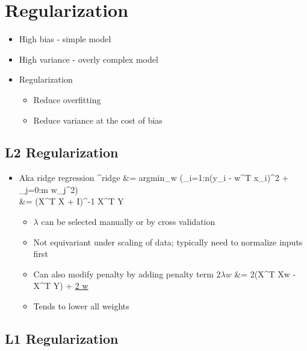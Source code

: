 \documentclass[12pt]{article}
\newenvironment{eqn}{\equation\alignedat{3}}{\endalignedat\endequation}
\begin{document}
\section{Regularization}

\begin{itemize}
	\item High bias - simple model
	\item High variance - overly complex model
	\item Regularization 
	\begin{itemize}
		\item Reduce overfitting 
		\item Reduce variance at the cost of bias
	\end{itemize}
\end{itemize}

\subsection{L2 Regularization}

\begin{itemize}
	\item Aka ridge regression
	\begin{eqn}
		^{ridge} &= argmin_w (\Sigma_{i=1:n}(y_i - w^T x_i)^2 + \lambda \Sigma_{j=0:m} w_j^2) \\
		&= (X^T X + \lambda I)^{-1} X^T Y
	\end{eqn}
	\begin{itemize}
		\item $\lambda$ can be selected manually or by cross validation
		\item Not equivariant under scaling of data; typically need to normalize inputs first
		\item Can also modify penalty by adding penalty term $2\lambda w$
		\begin{eqn}
			 &= 2(X^T Xw - X^T Y) + \underline{2 \lambda w}
		\end{eqn}
		\item Tends to lower all weights
	\end{itemize}
\end{itemize}

\subsection{L1 Regularization}
\end{document}
